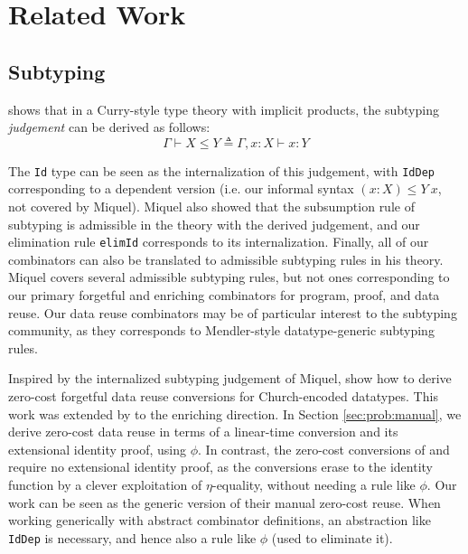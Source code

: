 \documentclass[acmsmall]{acmart}\settopmatter{}
\newcommand{\refsec}[1]{Section \ref{sec:#1}}
\newcommand{\labsec}[1]{\label{sec:#1}}
\begin{document}


\section{Related Work}
\labsec{others}

\subsection{Subtyping}
\labsec{others:judg}

\citet{miquel01} shows that in a Curry-style type theory with implicit
products, the subtyping \textit{judgement} can be derived as follows:
$$
\Gamma\vdash X \leq Y \triangleq \Gamma,x:X\vdash x:Y
$$

The \verb;Id; type can be seen as the internalization of this
judgement, with \verb;IdDep; corresponding to a dependent version
(i.e. our informal syntax $(x:X) \leq Y~x$, not covered by Miquel).
Miquel also showed that the subsumption rule of subtyping is
admissible in the theory with the derived judgement, and our
elimination rule \verb;elimId; corresponds to its internalization.
Finally, all of our combinators can also be translated to admissible
subtyping rules in his theory. Miquel covers several admissible
subtyping rules, but not ones corresponding to our primary forgetful
and enriching combinators for program, proof, and data reuse. Our data
reuse combinators may be of particular interest to the subtyping
community, as they corresponds to Mendler-style datatype-generic
subtyping rules.

Inspired by the internalized subtyping judgement of Miquel,
\citet{barras:implicit} show how to derive zero-cost forgetful data
reuse conversions for Church-encoded datatypes.
This work was extended by \citet{diehl} to the enriching direction.
In \refsec{prob:manual}, we derive zero-cost data reuse in terms of a
linear-time conversion and its extensional identity proof, using
$\phi$. In contrast, the zero-cost conversions of
\citet{barras:implicit} and \citet{diehl} require no extensional
identity proof, as the conversions erase to the identity function by a
clever exploitation of $\eta$-equality, without needing a rule like
$\phi$. Our work can be seen as the generic version of their manual
zero-cost reuse. When working generically with abstract combinator
definitions, an abstraction like \verb;IdDep; is necessary,
and hence also a rule like $\phi$ (used to eliminate it).
\end{document}
